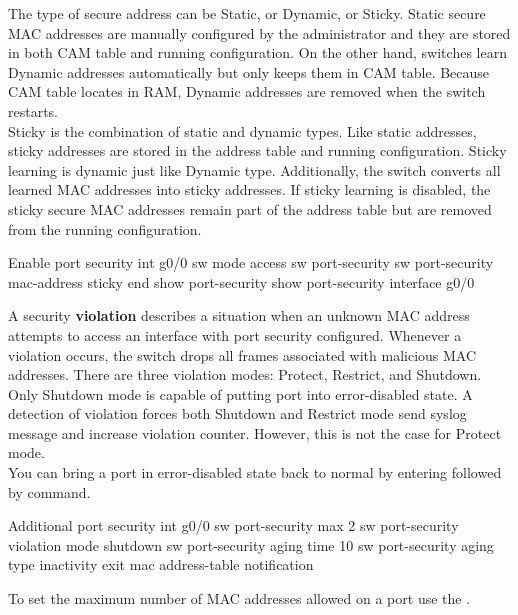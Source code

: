 The type of secure address can be Static, or Dynamic, or Sticky. Static secure MAC addresses are manually configured by the administrator and they are stored in both CAM table and running configuration. On the other hand, switches learn Dynamic addresses automatically but only keeps them in CAM table. Because CAM table locates in RAM, Dynamic addresses are removed when the switch restarts. \\

Sticky is the combination of static and dynamic types. Like static addresses, sticky addresses are stored in the address table and running configuration. Sticky learning is dynamic just like Dynamic type. Additionally, the switch converts all learned MAC addresses into sticky addresses. If sticky learning is disabled, the sticky secure MAC addresses remain part of the address table but are removed from the running configuration.

\begin{sexylisting}{Enable port security}
int g0/0
	sw mode access
	sw port-security
	sw port-security mac-address sticky 
	end	
show port-security
show port-security interface g0/0	
\end{sexylisting}




A security \textbf{violation} describes a situation when an unknown MAC address attempts to access an interface with port security configured. Whenever a violation occurs, the switch drops all frames associated with malicious MAC addresses. There are three violation modes: Protect, Restrict, and Shutdown. Only Shutdown mode is capable of putting port into error-disabled state. A detection of violation forces both Shutdown and Restrict mode send syslog message and increase violation counter. However, this is not the case for Protect mode.\\

You can bring a port in error-disabled state back to normal by entering  followed by  command. 

\begin{sexylisting}{Additional port security}
int g0/0
	sw port-security max 2
	sw port-security violation mode shutdown
	sw port-security aging time 10
	sw port-security aging type inactivity
	exit
mac address-table notification	
\end{sexylisting}

To set the maximum number of MAC addresses allowed on a port use the .\\

